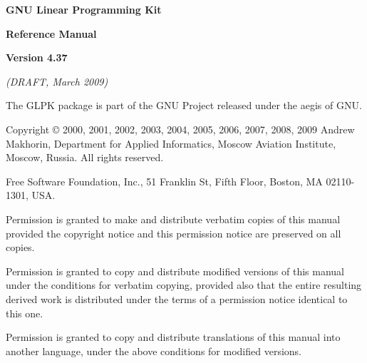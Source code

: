 \documentclass[dvipdfm,11pt]{report}
\begin{document}
\thispagestyle{empty}

\begin{center}

\vspace*{1in}

\begin{huge}
\bf GNU Linear Programming Kit
\end{huge}

\vspace{0.5in}

\begin{LARGE}
\bf Reference Manual
\end{LARGE}

\vspace{0.5in}

\begin{LARGE}
\bf Version 4.37
\end{LARGE}

\vspace{0.5in}
\begin{Large}
\it(DRAFT, March 2009)
\end{Large}
\end{center}

\newpage

\vspace*{1in}

\vfill

\noindent
The GLPK package is part of the GNU Project released under the aegis of
GNU.

\medskip \noindent
Copyright \copyright{} 2000, 2001, 2002, 2003, 2004, 2005, 2006, 2007,
2008, 2009 Andrew Makhorin, Department for Applied Informatics, Moscow
Aviation Institute, Moscow, Russia. All rights reserved.

\medskip \noindent
Free Software Foundation, Inc., 51 Franklin St, Fifth Floor, Boston, MA
02110-1301, USA.

\medskip \noindent
Permission is granted to make and distribute verbatim copies of this
manual provided the copyright notice and this permission notice are
preserved on all copies.

\medskip \noindent
Permission is granted to copy and distribute modified versions of this
manual under the conditions for verbatim copying, provided also that the
entire resulting derived work is distributed under the terms of
a permission notice identical to this one.

\medskip \noindent
Permission is granted to copy and distribute translations of this manual
into another language, under the above conditions for modified versions.

\tableofcontents















\appendix










\end{document}
